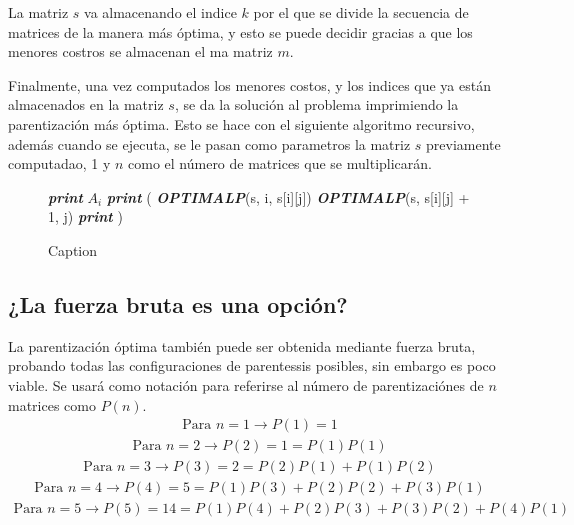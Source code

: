 \documentclass[12pt,twoside]{article}
\begin{document}
La matriz $s$ va almacenando el indice $k$ por el que se divide la secuencia de matrices de la manera m\'as \'optima, y esto se puede decidir gracias a que los menores costros se almacenan el ma matriz $m$.

Finalmente, una vez computados los menores costos, y los indices que ya est\'an almacenados en la matriz $s$, se da la soluci\'on al problema imprimiendo la parentizaci\'on m\'as \'optima. Esto se hace con el siguiente algoritmo recursivo, adem\'as cuando se ejecuta, se le pasan como parametros la matriz $s$ previamente computadao, 1 y $n$ como el n\'umero de matrices que se multiplicar\'an.

\begin{figure}[ht]
    \centering
    \begin{algorithmic}
                \State \textit{\textbf{print}} $A_i$
            \Else
                \State \textit{\textbf{print}} (
                \State \textit{\textbf{OPTIMALP}}(s, i, s[i][j])
                \State \textit{\textbf{OPTIMALP}}(s, s[i][j] + 1, j)
                \State \textit{\textbf{print}} )
            \EndIf
        \EndProcedure
    \end{algorithmic}
    \caption{Caption}
    \label{fig:my_label}
\end{figure}

\subsection{¿La fuerza bruta es una opci\'on?}

La parentizaci\'on \'optima tambi\'en puede ser obtenida mediante fuerza bruta, probando todas las configuraciones de parentessis posibles, sin embargo es poco viable. Se usar\'a como notaci\'on para referirse al n\'umero de parentizaci\'ones de $n$ matrices como $P(n)$.
\begin{align*}
    \text{Para } n=1 \longrightarrow P(1) = 1
\end{align*}
\begin{align*}
    \text{Para } n=2 \longrightarrow P(2) = 1 = P(1)P(1)
\end{align*}
\begin{align*}
    \text{Para } n=3 \longrightarrow P(3) = 2 = P(2)P(1) + P(1)P(2) 
\end{align*}
\begin{align*}
    \text{Para } n=4 \longrightarrow P(4) = 5 = P(1)P(3) + P(2)P(2) + P(3)P(1)
\end{align*}
\begin{align*}
    \text{Para } n=5 \longrightarrow P(5) = 14 = P(1)P(4) + P(2)P(3) + P(3)P(2) + P(4)P(1)
\end{align*}
\end{document}
